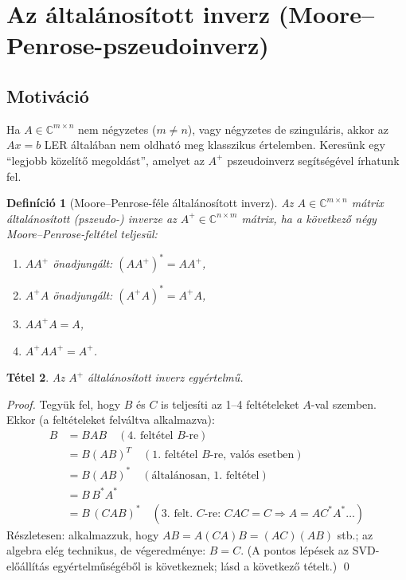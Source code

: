 \documentclass[a4paper,12pt]{article}
\theoremstyle{mydef}
\newtheorem{tetel}{Tétel}[section]
\newtheorem{definicio}[tetel]{Definíció}
\newcommand{\C}{\mathbb{C}}
\begin{document}
\section{Az általánosított inverz (Moore--Penrose-pszeudoinverz)}
\label{sec:pseudoinv}

\subsection*{Motiváció}

Ha $A \in \C^{m\times n}$ nem négyzetes ($m \ne n$), vagy négyzetes de szinguláris, akkor
az $Ax = b$ LER általában nem oldható meg klasszikus értelemben. Keresünk egy
``legjobb közelítő megoldást'', amelyet az $A^+$ pszeudoinverz segítségével írhatunk fel.

\begin{mdframed}[backgroundcolor=defbg,linewidth=0pt,innertopmargin=8pt,innerbottommargin=8pt]
\begin{definicio}[Moore--Penrose-féle általánosított inverz]
Az $A \in \C^{m\times n}$ mátrix \emph{általánosított (pszeudo-) inverze} az $A^+ \in \C^{n\times m}$
mátrix, ha a következő négy \emph{Moore--Penrose-feltétel} teljesül:
\begin{enumerate}[noitemsep,topsep=2pt]
  \item $AA^+$ önadjungált: $(AA^+)^* = AA^+$,
  \item $A^+A$ önadjungált: $(A^+A)^* = A^+A$,
  \item $AA^+A = A$,
  \item $A^+AA^+ = A^+$.
\end{enumerate}
\end{definicio}
\end{mdframed}

\begin{mdframed}[backgroundcolor=thmbg,linewidth=0pt,innertopmargin=8pt,innerbottommargin=8pt]
\begin{tetel}
Az $A^+$ általánosított inverz \emph{egyértelmű}.
\end{tetel}
\end{mdframed}

\begin{proof}
Tegyük fel, hogy $B$ és $C$ is teljesíti az 1--4 feltételeket $A$-val szemben.
Ekkor (a feltételeket felváltva alkalmazva):
\begin{align*}
  B &= BAB \quad (\text{4. feltétel }B\text{-re}) \\
  &= B(AB)^T \quad (\text{1. feltétel }B\text{-re, valós esetben}) \\
  &= B(AB)^* \quad (\text{általánosan, 1. feltétel}) \\
  &= B\,B^*A^* \\
  &= B\,(CAB)^* \quad (\text{3. felt.\ }C\text{-re: }CAC=C\Rightarrow A=A C^* A^*\ldots)
\end{align*}
Részletesen: alkalmazzuk, hogy $AB = A(CA)B = (AC)(AB)$ stb.; az algebra elég
technikus, de végeredménye: $B = C$. (A pontos lépések az SVD-előállítás
egyértelműségéből is következnek; lásd a következő tételt.) \qed
\end{proof}
\end{document}
